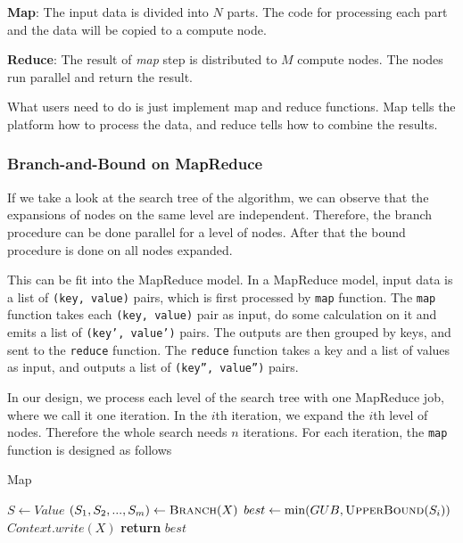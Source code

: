 \noindent \textbf{Map}: The input data is divided into $N$ parts. The code for processing each part and the data will be copied to a compute node.

\noindent \textbf{Reduce}: The result of \textit{map} step is distributed to $M$ compute nodes. The nodes run parallel and return the result.

What users need to do is just implement map and reduce functions. Map tells the platform how to process the data, and reduce tells how to combine the results.

\subsubsection{Branch-and-Bound on MapReduce}
If we take a look at the search tree of the algorithm, we can observe that the expansions of nodes on the same level are independent. Therefore, the branch procedure can be done parallel for a level of nodes. After that the bound procedure is done on all nodes expanded.

This can be fit into the MapReduce model. In a MapReduce model, input data is a list of \texttt{(key, value)} pairs, which is first processed by \texttt{map} function. The \texttt{map} function takes each \texttt{(key, value)} pair as input, do some calculation on it and emits a list of \texttt{(key', value')} pairs. The outputs are then grouped by keys, and sent to the \texttt{reduce} function. The \texttt{reduce} function takes a key and a list of values as input, and outputs a list of \texttt{(key'', value'')} pairs.

In our design, we process each level of the search tree with one MapReduce job, where we call it one iteration. In the $i$th iteration, we expand the $i$th level of nodes. Therefore the whole search needs $n$ iterations. For each iteration, the \texttt{map} function is designed as follows
\begin{algorithm}
\caption{Map}
\begin{algorithmic}[1]
    \State $S \gets Value$
    \State $(S_1,S_2,...,S_m) \gets \textsc{Branch}(X)$
        \State $best \gets \min(GUB, \textsc{UpperBound}(S_i))$
    \EndFor
            \State $Context.write(X)$
        \EndIf
    \EndFor
    \State \textbf{return }$best$
\EndFunction
\end{algorithmic}
\end{algorithm}

